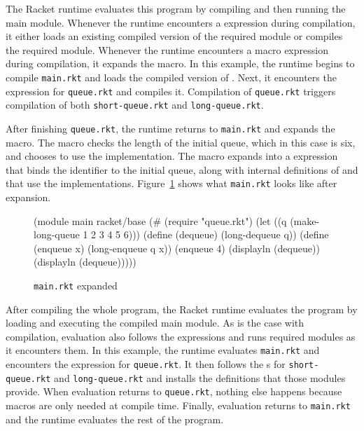 The Racket runtime evaluates this program by compiling and then running the main module.
Whenever the runtime encounters a  expression during compilation, it either loads an existing compiled version of the required module or compiles the required module.
Whenever the runtime encounters a macro expression during compilation, it expands the macro.
In this example, the runtime begins to compile \texttt{main.rkt} and loads the compiled version of . 
Next, it encounters the  expression for \texttt{queue.rkt} and compiles it.
Compilation of \texttt{queue.rkt} triggers compilation of both \texttt{short-queue.rkt} and \texttt{long-queue.rkt}. 

After finishing \texttt{queue.rkt}, the runtime returns to \texttt{main.rkt} and expands the  macro.
The  macro checks the length of the initial queue, which in this case is six, and chooses to use the  implementation.
The macro expands into a  expression that binds the identifier  to the initial queue, along with internal definitions of  and  that use the  implementations.
Figure~\ref{main-expanded-rkt} shows what \texttt{main.rkt} looks like after expansion.

\begin{figure}[h]
\begin{schemedisplay}
(module main racket/base
  (#%
   (require "queue.rkt")
   (let ((q (make-long-queue 1 2 3 4 5 6)))
     (define (dequeue) (long-dequeue q))
     (define (enqueue x) (long-enqueue q x))
     (enqueue 4)
     (displayln (dequeue))
     (displayln (dequeue)))))
\end{schemedisplay}
\caption{\texttt{main.rkt} expanded}
\label{main-expanded-rkt}
\end{figure}


After compiling the whole program, the Racket runtime evaluates the program by loading and executing the compiled main module.
As is the case with compilation, evaluation also follows the  expressions and runs required modules as it encounters them.
In this example, the runtime evaluates \texttt{main.rkt} and encounters the  expression for \texttt{queue.rkt}.
It then follows the s for \texttt{short-queue.rkt} and \texttt{long-queue.rkt} and installs the definitions that those modules provide.
When evaluation returns to \texttt{queue.rkt}, nothing else happens because macros are only needed at compile time.
Finally, evaluation returns to \texttt{main.rkt} and the runtime evaluates the rest of the program.

